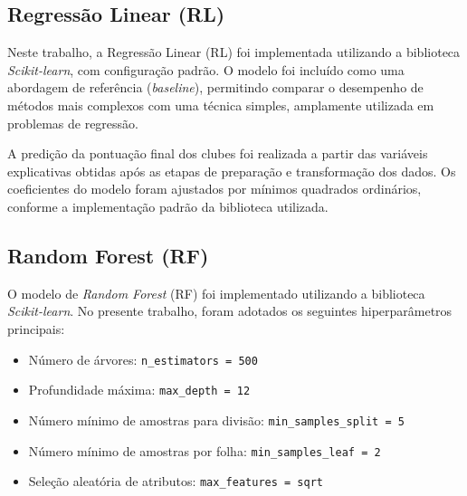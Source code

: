 \subsection{Regressão Linear (RL)}

Neste trabalho, a Regressão Linear (RL) foi implementada utilizando a biblioteca \textit{Scikit-learn}, com configuração padrão. 
O modelo foi incluído como uma abordagem de referência (\textit{baseline}), permitindo comparar o desempenho de métodos mais complexos 
com uma técnica simples, amplamente utilizada em problemas de regressão.

A predição da pontuação final dos clubes foi realizada a partir das variáveis explicativas obtidas após as etapas de preparação e transformação dos dados. 
Os coeficientes do modelo foram ajustados por mínimos quadrados ordinários, conforme a implementação padrão da biblioteca utilizada.

\subsection{Random Forest (RF)}

O modelo de \textit{Random Forest} (RF) foi implementado utilizando a biblioteca \textit{Scikit-learn}. 
No presente trabalho, foram adotados os seguintes hiperparâmetros principais:

\begin{itemize}
    \item Número de árvores: \texttt{n\_estimators = 500}
    \item Profundidade máxima: \texttt{max\_depth = 12}
    \item Número mínimo de amostras para divisão: \texttt{min\_samples\_split = 5}
    \item Número mínimo de amostras por folha: \texttt{min\_samples\_leaf = 2}
    \item Seleção aleatória de atributos: \texttt{max\_features = sqrt}
\end{itemize}


